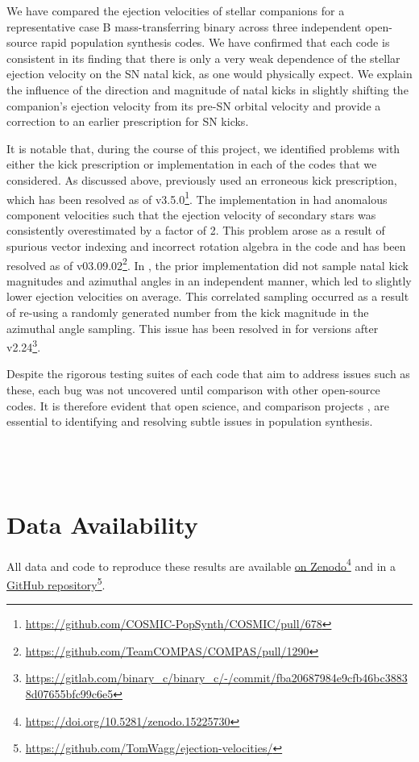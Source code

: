 \documentclass[apj,twocolumn]{openjournal}
\begin{document}
We have compared the ejection velocities of stellar companions for a representative case B mass-transferring binary across three independent open-source rapid population synthesis codes. We have confirmed that each code is consistent in its finding that there is only a very weak dependence of the stellar ejection velocity on the SN natal kick, as one would physically expect. We explain the influence of the direction and magnitude of natal kicks in slightly shifting the companion's ejection velocity from its pre-SN orbital velocity and provide a correction to an earlier prescription for SN kicks.

It is notable that, during the course of this project, we identified problems with either the kick prescription or implementation in each of the codes that we considered. As discussed above, \cosmic previously used an erroneous kick prescription, which has been resolved as of v3.5.0\footnote{\url{https://github.com/COSMIC-PopSynth/COSMIC/pull/678}}. The implementation in \compas had anomalous component velocities such that the ejection velocity of secondary stars was consistently overestimated by a factor of 2. This problem arose as a result of spurious vector indexing and incorrect rotation algebra in the code and has been resolved as of \compas v03.09.02\footnote{\url{https://github.com/TeamCOMPAS/COMPAS/pull/1290}}. In \binc, the prior implementation did not sample natal kick magnitudes and azimuthal angles in an independent manner, which led to slightly lower ejection velocities on average. This correlated sampling occurred as a result of re-using a randomly generated number from the kick magnitude in the azimuthal angle sampling. This issue has been resolved in \binc for versions after v2.24\footnote{\url{https://gitlab.com/binary_c/binary_c/-/commit/fba20687984e9cfb46bc38838d07655bfc99c6e5}}.

Despite the rigorous testing suites of each code that aim to address issues such as these, each bug was not uncovered until comparison with other open-source codes. It is therefore evident that open science, and comparison projects \citep[e.g.,][]{Toonen+2014:2014A&A...562A..14T, O'Connor+2018:2018JPhG...45j4001O}, are essential to identifying and resolving subtle issues in population synthesis.\\\\\\\\


\section*{Data Availability}
All data and code to reproduce these results are available \href{https://doi.org/10.5281/zenodo.15225730}{on Zenodo}\footnote{\url{https://doi.org/10.5281/zenodo.15225730}} and in a \href{https://github.com/TomWagg/ejection-velocities/}{GitHub repository}\footnote{\url{https://github.com/TomWagg/ejection-velocities/}}.
\end{document}
